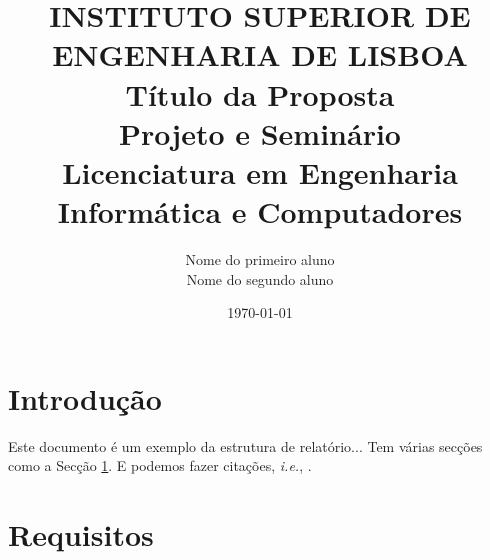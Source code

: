 \documentclass[12pt,a4paper]{article}
\def\paperid{\hfill}
\begin{document}
\title{\vskip-1.45cm
\hskip-13cm  {\small {\vskip-1.45cm{\hskip2.8cm\textbf{INSTITUTO SUPERIOR DE ENGENHARIA DE LISBOA}}}}
\vskip1.45cm
{\bf Título da Proposta} \\[3ex]
{\small Projeto e Seminário\\[-1ex]
 Licenciatura em Engenharia Informática e Computadores}
}
\author{ Nome do primeiro aluno\\[1ex]
 Nome do segundo aluno\\[1ex]
}
\date{\small\today}
\maketitle
\def\paperid{\hfill}

\section{Introdução}\label{section:primeiraSec}

Este documento é um exemplo da estrutura de relatório... Tem várias secções como
a Secção \ref{section:primeiraSec}.  E podemos fazer citações, {\it i.e.}, \citep{ref1}.
\section{Requisitos}
\end{document}
